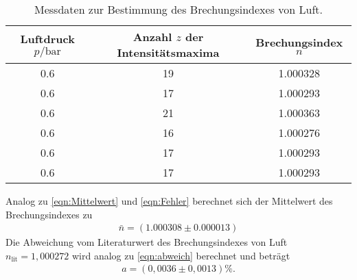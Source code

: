 \begin{table}[H]
  \centering
  \caption{Messdaten zur Bestimmung des Brechungsindexes von Luft.}
  \label{tab:Brechungsindex}
  \begin{tabular}{S[table-format=1.1] S[table-format=2.0] S[table-format=1.6]}
  \toprule
  {Luftdruck $ p / \si{\bar}$} & {Anzahl $z$ der Intensitätsmaxima} & {Brechungsindex $n$}\\
   & 19 & 1.000328 \\
    0.6 & 17 & 1.000293 \\
    0.6 & 21 & 1.000363 \\
    0.6 & 16 & 1.000276 \\
    0.6 & 17 & 1.000293 \\
    0.6 & 17 & 1.000293 \\
  \bottomrule
  \end{tabular}
\end{table}

Analog zu \autoref{eqn:Mittelwert} und \autoref{eqn:Fehler} berechnet sich der Mittelwert des Brechungsindexes zu
\begin{align*}
  \bar{n}= (1.000308 \pm 0.000013)
\end{align*}
Die Abweichung vom Literaturwert \cite{Brechungsindex} des Brechungsindexes von Luft $n_{\text{lit}}= 1,000272$
wird analog zu \autoref{eqn:abweich} berechnet und beträgt
\begin{align*}
  a=(0,0036 \pm 0,0013) \si{\percent}.
\end{align*}

